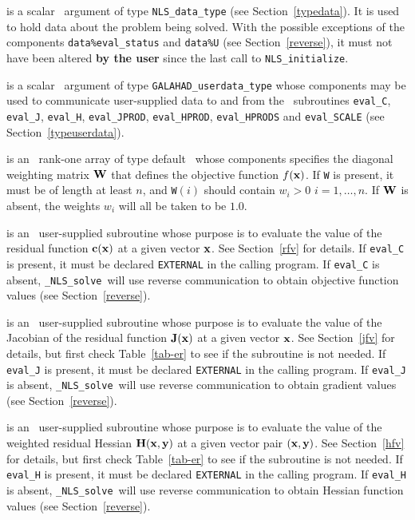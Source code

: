 \documentclass{galahad}
\newcommand{\packagename}{NLS}
\newcommand{\fullpackagename}{\libraryname\_\packagename}
\newcommand{\solver}{{\tt \fullpackagename\_solve}}
\begin{document}
\begin{description}
 is a scalar \intentinout\ argument of type
{\tt \packagename\_data\_type}
(see Section~\ref{typedata}). It is used to hold data about the problem being
solved. With the possible exceptions of the components
{\tt data\%eval\_status} and {\tt data\%U} (see Section~\ref{reverse}),
it must not have been altered {\bf by the user} since the last call to
{\tt \packagename\_initialize}.

 is a scalar \intentinout\ argument of type
{\tt GALAHAD\_userdata\_type} whose components may be used
to communicate user-supplied data to and from the \optional\ subroutines
{\tt eval\_C}, {\tt eval\_J}, {\tt eval\_H}, {\tt eval\_JPROD},
{\tt eval\_HPROD}, {\tt eval\_HPRODS} and {\tt eval\_SCALE}
(see Section~\ref{typeuserdata}).

 is an \optional\ rank-one array of type default \realdp\
whose components specifies the diagonal weighting matrix ${\mathbf{W}}$ that
defines the objective function $f({\mathbf{x}})$. If {\tt W} is present, it
must be of length at least $n$, and {\tt W}$(i)$ should contain $w_i > 0$
$i = 1, \ldots, n$. If ${\mathbf{W}}$ is absent, the weights $w_i$ will all be
taken to be $1.0$.

 is an \optional\
user-supplied subroutine whose purpose is to evaluate the value of the
residual function ${\mathbf{c}}({\mathbf{x}})$ at a given vector ${\mathbf{x}}$.
See Section~\ref{rfv} for details.
If {\tt eval\_C} is present,
it must be declared {\tt EXTERNAL} in the calling program.
If {\tt eval\_C} is absent, \solver\ will use reverse communication to
obtain objective function values (see Section~\ref{reverse}).

 is an \optional\
user-supplied subroutine whose purpose is to evaluate the value of the
Jacobian of the residual function ${\mathbf{J}}({\mathbf{x}})$ at a given vector ${\mathbf{x}}$.
See Section~\ref{jfv} for details,
but first check Table~\ref{tab-er} to see if the subroutine is not needed.
If {\tt eval\_J} is present,
it must be declared {\tt EXTERNAL} in the calling program.
If {\tt eval\_J} is absent, \solver\ will use reverse communication to
obtain gradient values (see Section~\ref{reverse}).

\itt{eval\_H} is an \optional\
user-supplied subroutine whose purpose is to evaluate the value of the
weighted residual Hessian ${\mathbf{H}}({\mathbf{x}},{\mathbf{y}})$ at a given vector pair
$({\mathbf{x}},{\mathbf{y}})$. See Section~\ref{hfv} for details,
but first check Table~\ref{tab-er} to see if the subroutine is not needed.
If {\tt eval\_H} is present,
it must be declared {\tt EXTERNAL} in the calling program.
If {\tt eval\_H} is absent, \solver\ will use reverse communication to
obtain Hessian function values (see Section~\ref{reverse}).


\end{description}
\end{document}
